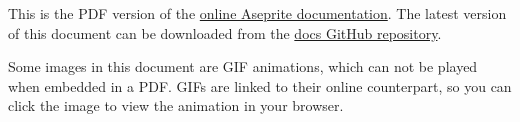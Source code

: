 \date{\today}
\maketitle
{}
\rhead{\today}
\begin{center}
    This is the PDF version of the \href{https://aseprite.org/docs/}{online Aseprite documentation}.
    The latest version of this document can be downloaded from the \href{https://github.com/aseprite/docs/}{docs GitHub repository}.

    Some images in this document are GIF animations, which can not be played when embedded in a PDF. 
    GIFs are linked to their online counterpart, so you can click the image to view the animation in your browser.
\end{center}
